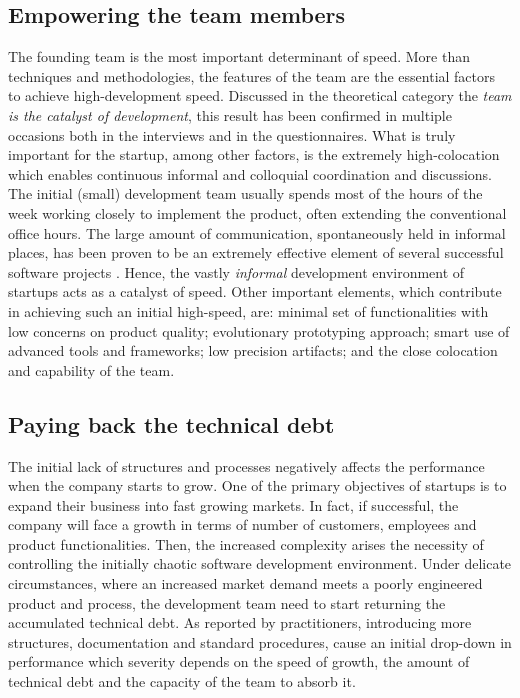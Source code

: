 \documentclass[10pt,journal,letterpaper,compsoc]{IEEEtran}
\begin{document}
\subsection{Empowering the team members}
The founding team is the most important determinant of speed. More than 
techniques and methodologies, the features of the team are the essential factors 
to achieve high-development speed. Discussed in the theoretical category the 
\textit{team is the catalyst of development}, this result has been confirmed in 
multiple occasions both in the interviews and in the questionnaires. What is 
truly important for the startup, among other factors, is the extremely 
high-colocation which enables continuous informal and colloquial coordination 
and discussions. The initial (small) development team usually spends most of the 
hours of the week working closely to implement the product, often extending the 
conventional office hours.  The large amount of communication, spontaneously 
held in informal places, has been proven to be an extremely effective element of 
several successful software projects \cite{Highsmith2000}. Hence, the vastly 
\textit{informal} development environment of startups acts as a catalyst of 
speed. Other important elements, which contribute in achieving such an initial 
high-speed, are: minimal set of functionalities with low concerns on product 
quality; evolutionary prototyping approach; smart use of advanced tools and 
frameworks; low precision artifacts; and the close colocation and capability of 
the team.

\subsection{Paying back the technical debt}
The initial lack of structures and processes negatively affects the 
performance when the company starts to grow. One of the primary objectives of 
startups is to expand their business into fast growing markets. In fact, if 
successful, the company will face a growth in terms of number of customers, 
employees and product functionalities. Then, the increased complexity arises the 
necessity of controlling the initially chaotic software development environment. 
Under delicate circumstances, where an increased market demand meets a poorly 
engineered product and process,  the development team need to start returning 
the accumulated technical debt. As reported by practitioners, introducing more 
structures, documentation and standard procedures, cause an initial drop-down in 
performance which severity depends on the speed of growth, the amount of 
technical debt and the capacity of the team to absorb it. 
\end{document}
